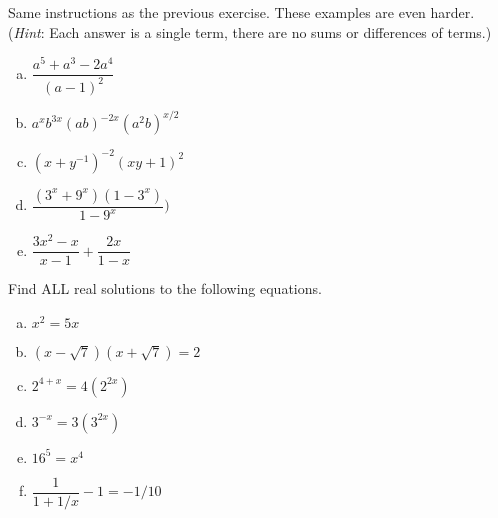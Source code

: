 \begin{exercise}\label{exercise:BeforeWeBegin:9}
Same instructions as the previous exercise. These examples are even harder. (\emph{Hint}: Each answer is a single term, there are no sums or differences of terms.)
\begin{multicols}{2}
\begin{enumerate}[(a)]
\item
$\dfrac{a^5 +a^3 - 2a^4}{(a-1)^2}$
\item
$a^x b^{3x}(ab)^{-2x}(a^2 b)^{x/2}$
\item
$(x+y^{-1})^{-2}(xy+1)^2$
\item
$\dfrac{(3^x+9^x)(1-3^x)}{1-9^x})$
\item
$\dfrac{3x^2 - x}{x-1} + \dfrac{2x}{1-x}$

\end{enumerate}
\end{multicols}
\end{exercise}

\begin{exercise}\label{exercise:BeforeWeBegin:10}
Find ALL  real solutions to the following equations. 
\begin{multicols}{2}
\begin{enumerate}[(a)]
\item
$x^2 = 5x$
\item
$(x - \sqrt{7})(x+\sqrt{7}) = 2$
\item
$2^{4+x} = 4(2^{2x})$
\item
$3^{-x} = 3(3^{2x})$
\item
$16^5 = x^4$
\item
$\dfrac{1}{1 + 1/x} -1= -1/10$
\end{enumerate}
\end{multicols}
\end{exercise}